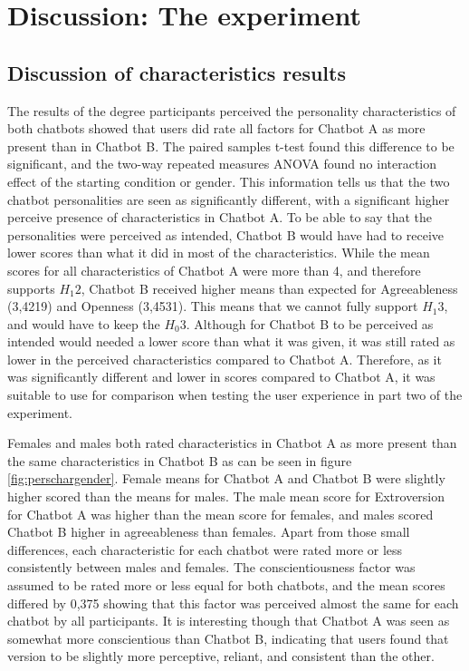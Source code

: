 \section{Discussion: The experiment}

\subsection{Discussion of characteristics results}
The results of the degree participants perceived the personality characteristics of both chatbots showed that users did rate all factors for Chatbot A as more present than in Chatbot B. The paired samples t-test found this difference to be significant, and the two-way repeated measures ANOVA found no interaction effect of the starting condition or gender. This information tells us that the two chatbot personalities are seen as significantly different, with a significant higher perceive presence of characteristics in Chatbot A. To be able to say that the personalities were perceived as intended, Chatbot B would have had to receive lower scores than what it did in most of the characteristics. While the mean scores for all characteristics of Chatbot A were more than 4, and therefore supports $H_1 2$, Chatbot B received higher means than expected for Agreeableness (3,4219) and Openness (3,4531). This means that we cannot fully support $H_1 3$, and would have to keep the $H_0 3$. Although for Chatbot B to be perceived as intended would needed a lower score than what it was given, it was still rated as lower in the perceived characteristics compared to Chatbot A. Therefore, as it was significantly different and lower in scores compared to Chatbot A, it was suitable to use for comparison when testing the user experience in part two of the experiment.

Females and males both rated characteristics in Chatbot A as more present than the same characteristics in Chatbot B as can be seen in figure \ref{fig:perschargender}. Female means for Chatbot A and Chatbot B were slightly higher scored than the means for males. The male mean score for Extroversion for Chatbot A was higher than the mean score for females, and males scored Chatbot B higher in agreeableness than females. Apart from those small differences, each characteristic for each chatbot were rated more or less consistently between males and females. The conscientiousness factor was assumed to be rated more or less equal for both chatbots, and the mean scores differed by 0,375 showing that this factor was perceived almost the same for each chatbot by all participants. It is interesting though that Chatbot A was seen as somewhat more conscientious than Chatbot B, indicating that users found that version to be slightly more perceptive, reliant, and consistent than the other.  

